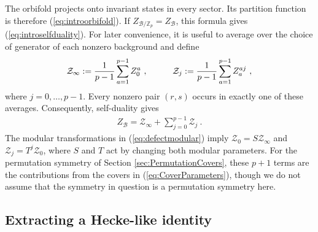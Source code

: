 \documentclass[12pt]{article}
\numberwithin{equation}{section}
\newcommand{\bea}{\begin{eqnarray}}
\newcommand{\eea}{\end{eqnarray}}
\def\ZZ{\mathbb{Z}}
\def\cB{\mathcal{B}}
\def\cZ{\mathcal{Z}}
\theoremstyle{remark}
\begin{document}
 
The orbifold projects onto invariant states in every sector. Its partition function is therefore (\ref{eq:introorbifold}). If $Z_{\cB/\ZZ_p}=Z_{\cB}$, this formula gives (\ref{eq:introselfduality}). For later convenience, it is useful to average over the choice of generator of each nonzero background and define
\bea
\cZ_\infty:={1\over p-1}\sum_{a=1}^{p-1}Z^a_0~,\hspace{0.4 in} \cZ_j:={1\over p-1}\sum_{a=1}^{p-1}Z^{aj}_a~,
\eea
where $j=0,\ldots,p-1$. Every nonzero pair $(r,s)$ occurs in exactly one of these averages.
Consequently, self-duality gives
\bea \label{eq:averagedselfduality}
Z_{\cB}=\cZ_\infty+\sum_{j=0}^{p-1}\cZ_j~.
\eea
The modular transformations in (\ref{eq:defectmodular}) imply $\cZ_0=S\cZ_\infty$ and $\cZ_j=T^j\cZ_0$, where $S$ and $T$ act by changing both modular parameters. For the permutation symmetry of Section \ref{sec:PermutationCovers}, these $p+1$ terms are the contributions from the covers in (\ref{eq:CoverParameters}), though we do not assume that the symmetry in question is a permutation symmetry here.


\subsection{Extracting a Hecke-like identity}
\label{sec:mainidentity}
\end{document}
